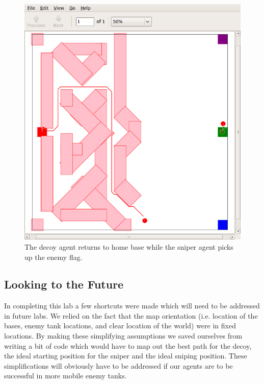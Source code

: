 \begin{figure}\label{fig:capture}
\begin{center}
\includegraphics[width=\textwidth]{06capture.png}
\caption{The decoy agent returns to home base while the sniper agent picks up the enemy flag.}
\end{center}
\end{figure}

\subsection{Looking to the Future}

In completing this lab a few shortcuts were made which will need to be addressed in future labs.  We relied on the fact that the map orientation (i.e. location of the bases, enemy tank locations, and clear location of the world) were in fixed locations.  By making these simplifying assumptions we saved ourselves from writing a bit of code which would have to map out the best path for the decoy, the ideal starting position for the sniper and the ideal sniping position.  These simplifications will obviously have to be addressed if our agents are to be successful in more mobile enemy tanks.

